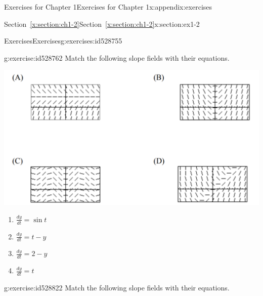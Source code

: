 \documentclass[oneside,10pt,]{book}
\newcommand{\xreffont}{\relax}
\numberwithin{equation}{section}
\numberwithin{equation}{section}
\begin{document}
\begin{appendixptx}{Exercises for Chapter 1}{}{Exercises for Chapter 1}{}{}{x:appendix:exercises}
\begin{sectionptx}{Section~{\xreffont\ref*{x:section:ch1-2}}}{}{Section~{\xreffont\ref*{x:section:ch1-2}}}{}{}{x:section:ex1-2}
%
%
\typeout{************************************************}
\typeout{************************************************}
%
\begin{exercises-subsection-numberless}{Exercises}{}{Exercises}{}{}{g:exercises:id528755}
\begin{divisionexercise}{1}{}{}{g:exercise:id528762}%
Match the following slope fields with their equations. \begin{image}{0}{1}{0}%
\includegraphics[width=\linewidth]{images/HWc1s2-1.png}
\end{image}%
%
\begin{enumerate}[label=(\alph*)]
\item{}\(\displaystyle \frac{dy}{dt}=\sin t\)%
\item{}\(\displaystyle \frac{dy}{dt}=t-y\)%
\item{}\(\displaystyle \frac{dy}{dt}=2-y\)%
\item{}\(\displaystyle \frac{dy}{dt}=t\)%
\end{enumerate}
%
\end{divisionexercise}%
\begin{divisionexercise}{2}{}{}{g:exercise:id528822}%
Match the following slope fields with their equations. \begin{image}{0}{1}{0}%

\end{image}
\end{divisionexercise}
\end{exercises-subsection-numberless}
\end{sectionptx}
\end{appendixptx}
\end{document}
